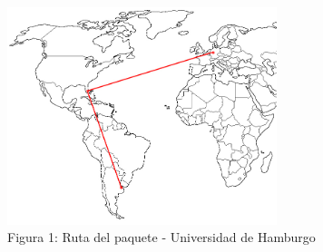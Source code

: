 \begin{figure}[h]
	\begin{center}
    \includegraphics[width=0.7\textwidth]{img_analisis3/mapa.jpg} 
    \caption{Figura 1: Ruta del paquete - Universidad de Hamburgo}	
	\end{center} 
\end{figure}

